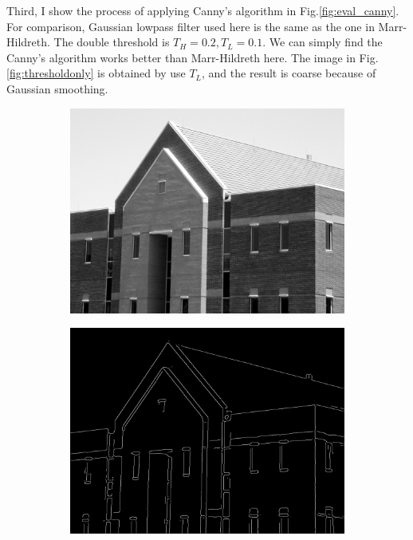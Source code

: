 Third, I show the process of applying Canny's algorithm in Fig.\ref{fig:eval_canny}. For comparison, Gaussian lowpass filter used here is the same as the one in Marr-Hildreth. The double threshold is $T_H=0.2, T_L=0.1$. We can simply find the Canny's algorithm works better than Marr-Hildreth here. The image in Fig.\ref{fig:thresholdonly} is obtained by use $T_L$, and the result is coarse because of Gaussian smoothing.\\
\begin{figure}[h!]
	\centering
	\begin{subfigure}[b]{0.45\linewidth}
		\includegraphics[width=\linewidth]{myfigure/p9/building.png}
		\caption{}
		\label{fig:canny_building}
	\end{subfigure}
	\begin{subfigure}[b]{0.45\linewidth}
    	\includegraphics[width=\linewidth]{myfigure/p9/9_threshold_only.png}

\end{subfigure}
\end{figure}
